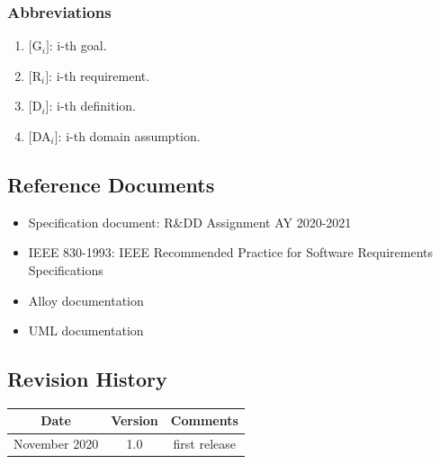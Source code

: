 \documentclass[a4paper, 12pt, oneside]{article}
\begin{document}
\subsubsection{Abbreviations}
\begin{enumerate}[label={AB.\arabic{*}}]
\item $[$G$_i]$: i-th goal.
\item $[$R$_i]$: i-th requirement.
\item $[$D$_i]$: i-th definition.
\item $[$DA$_i]$: i-th domain assumption.
\end{enumerate}

\subsection{Reference Documents}
\begin{itemize}
    \item Specification document: R\&DD Assignment AY 2020-2021
    \item IEEE 830-1993: IEEE Recommended Practice for Software Requirements Specifications
    \item Alloy documentation 
    \item UML documentation 
\end{itemize}

\subsection{Revision History}
\begin{center}
 \begin{tabular}{||c c c||}
 \hline
 Date & Version & Comments \\ [0.5ex] 
 \hline\hline
 November 2020 & 1.0 & first release \\ 
 \hline
 \hline
\end{tabular}
\end{center}
\end{document}
